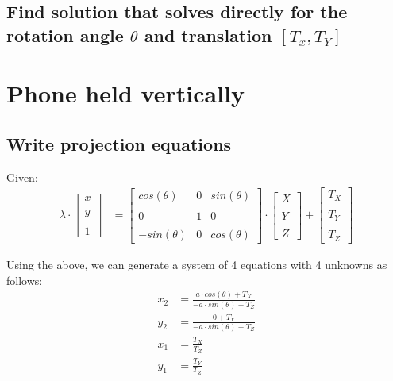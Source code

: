 \documentclass[12pt, oneside]{article}
\begin{document}
\subsection{Find solution that solves directly for the rotation angle $\theta$
and translation $[T_x, T_Y]$}

\section{Phone held vertically}

\subsection{Write projection equations}

Given:
\begin{align*}
    \lambda \cdot
    \begin{bmatrix} x \\ \\ y \\ \\ 1 \end{bmatrix}  
    &= 
    \begin{bmatrix} cos(\theta) & 0 & sin(\theta) \\ \\ 
                    0 & 1 & 0\\ \\ 
                    -sin(\theta) & 0 & cos(\theta)
    \end{bmatrix}  \cdot 
    \begin{bmatrix} X \\ \\ Y \\ \\ Z \end{bmatrix}  +
    \begin{bmatrix} T_X \\ \\ T_Y \\ \\ T_Z \end{bmatrix}  
\end{align*}

Using the above, we can generate a system of 4 equations with 4 unknowns as 
follows:
\begin{align*}
    x_2 &= \frac{a \cdot cos(\theta) + T_X}{-a \cdot sin(\theta) + T_Z} \\
    y_2 &= \frac{0 + T_Y}{-a \cdot sin(\theta) + T_Z} \\
    x_1 &= \frac{T_X}{T_Z}  \\
    y_1 &= \frac{T_Y}{T_Z} 
\end{align*}
\end{document}
